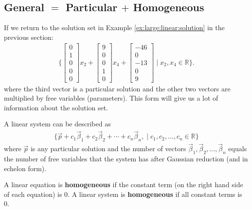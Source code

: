 \subsection{General $=$ Particular $+$ Homogeneous}

If we return to the solution set in Example \ref{ex:large:linear:solution} in the previous section:
%
\begin{align*}
\{ \begin{bmatrix}
0 \\ 1 \\ 0 \\ 0 \\0
\end{bmatrix} x_2 +
\begin{bmatrix}
9 \\ 0 \\ 0 \\ 1 \\ 0
\end{bmatrix} x_4 +
\begin{bmatrix}
-46 \\ 0  \\ -13 \\ 0 \\ 9
\end{bmatrix} \;  | \; x_2, x_4 \in \mathbb{R} \}.
\end{align*}
%
where the third vector is a particular solution and the other two vectors are multiplied by free variables (parameters).   This form will give us a lot of information about the solution set.


\begin{theorem}
A linear system can be described as
%
\begin{align*}
\{ \vec{p} + c_1 \vec{\beta}_1 + c_2 \vec{\beta}_2 + \cdots + c_n \vec{\beta}_n, \; | \; 	c_1, c_2, \ldots, c_n \in \mathbb{R} \}
\end{align*}
where $\vec{p}$ is any particular solution and the number of vectors $\vec{\beta}_1, \vec{\beta}_2, \ldots, \vec{\beta}_n$ equals the number of free variables that the system has after Gaussian reduction (and in echelon form).
\end{theorem}


\begin{definition}
A linear equation is \textbf{homogeneous} if the constant term (on the right hand side of each equation) is 0.  A linear system is \textbf{homogeneous} if all constant terms is 0.
\end{definition}

